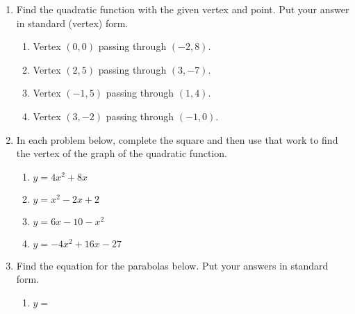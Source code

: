 \begin{enumerate}
\item Find the quadratic function with the given vertex and point.
  Put your answer in standard (vertex) form.
\begin{enumerate}
\item Vertex $(0,0)$ passing through $(-2,8)$.
\item Vertex $(2,5)$ passing through $(3,-7)$.
\item Vertex $(-1,5)$ passing through $(1,4)$.
\item Vertex $(3,-2)$ passing through $(-1,0)$.
\end{enumerate}

\item In each problem below, complete the square and then use that
  work to find the vertex of the graph of the quadratic function.
\begin{enumerate}
\item $y=4x^2+8x$
\item $y=x^2-2x+2$
\item $y=6x-10-x^2$
\item  $y=-4x^2+16x-27$
\end{enumerate}

\item Find the equation for the parabolas below.  Put your answers in
  standard form.
  \begin{enumerate}
  \item $y=$\\
\end{enumerate}
\end{enumerate}
